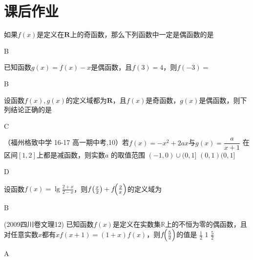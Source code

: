 \section{课后作业}
  \begin{exercise}
    \item
      如果$f(x)$是定义在$\mathbf{R}$上的奇函数，那么下列函数中一定是偶函数的是\xz      {}
      \begin{answer}
        B
      \end{answer}
    \item
      已知函数$g(x)=f(x)-x$是偶函数，且$ f(3)=4 $，则$ f(-3)= $\xz
      \begin{answer}
        B
      \end{answer}
    \item
      设函数$f(x),g(x)$的定义域都为$\mathbf{R}$，且$f(x)$是奇函数，$g(x)$是偶函数，则下列结论正确的是\xz
      \begin{answer}
        C
      \end{answer}
    \item
      （福州格致中学 16-17 高一期中考,10）若$f(x)=-x^2+2ax$与$g(x)=\dfrac a{x+1}$ 在区间$[1,2]$上都是减函数，则实数$a$ 的取值范围\xz
          {$(-1,0)\cup(0,1]$}
          {$(0,1)$}{$(0,1]$}
      \begin{answer}
        D
      \end{answer}
    \item
      设函数$f(x)=\lg \tfrac{2+x}{2-x}$，则$ f\!\left(\tfrac{x}{2}\right)+f\!\Bigl(\tfrac{2}{x}\Bigr) $的定义域为\xz
      \begin{answer}
        B
      \end{answer}
    \item
      (2009四川卷文理12) 已知函数$f(x)$是定义在实数集$\mathbb{R}$上的不恒为零的偶函数，且对任意实数$x$都有$xf(x+1)=(1+x)f(x) $，则$f\!\Bigl(\tfrac{5}{2}\Bigr) $的值是\xz
      {$\frac12$}
      {1}
      {$\frac52$}
      \begin{answer}
      A
      \end{answer}
    \item

\end{exercise}
